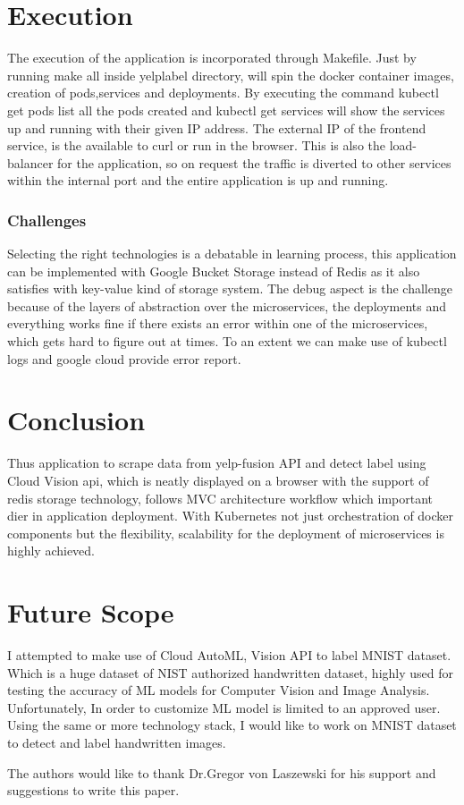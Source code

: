   \section{Execution}
  The execution of the application is incorporated through
  Makefile. Just by running make all inside yelplabel directory, will
  spin the docker container images, creation of pods,services and
  deployments. By executing the command kubectl get pods list all the
  pods created and kubectl get services will show the services up and
  running with their given IP address. The external IP of the frontend
  service, is the available to curl or run in the browser. This is
  also the load-balancer for the application, so on request the
  traffic is diverted to other services within the internal port and
  the entire application is up and running.
  
\subsubsection{Challenges} Selecting the right technologies is a
  debatable in learning process, this application can be implemented
  with Google Bucket Storage instead of Redis as it also satisfies
  with key-value kind of storage system. The debug aspect is the
  challenge because of the layers of abstraction over the
  microservices, the deployments and everything works fine if there
  exists an error within one of the microservices, which gets hard to
  figure out at times. To an extent we can make use of kubectl logs
  and google cloud provide error report.
  
  \section{Conclusion}
  Thus application to scrape data from yelp-fusion API and detect
  label using Cloud Vision api, which is neatly displayed on a browser
  with the support of redis storage technology, follows MVC
  architecture workflow which important dier in application
  deployment. With Kubernetes not just orchestration of docker
  components but the flexibility, scalability for the deployment of
  microservices is highly achieved.
  
  \section{Future Scope}
  I attempted to make use of Cloud AutoML, Vision API to label MNIST
  dataset. Which is a huge dataset of NIST authorized handwritten
  dataset, highly used for testing the accuracy of ML models for
  Computer Vision and Image Analysis. Unfortunately, In order to
  customize ML model is limited to an approved user. Using the same or
  more technology stack, I would like to work on MNIST dataset to
  detect and label handwritten images.

  \begin{acks}

    The authors would like to thank Dr.Gregor von Laszewski for his
    support and suggestions to write this paper.
  
  \end{acks}

   
